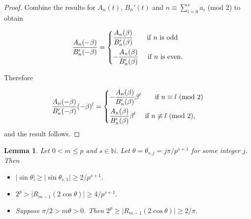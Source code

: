 \documentclass[11 pt]{amsart}
\theoremstyle{plain}
\newtheorem{lemma}[thm]{Lemma}
\theoremstyle{definition}
\theoremstyle{remark}
\def\N{\mathbb{N}}
\def\b{\beta}
\begin{document}
\begin{proof}
    Combine the results for $A_n(t)$, $B_n'(t)$ and $n \equiv \sum_{i=0}^s a_i$ (mod $2$) to obtain

    \begin{equation*}
        \frac{A_n(-\b)}{B_n'(-\b)}=\begin{dcases}
            \frac{A_n(\b)}{B_n'(\b)}  \qquad  \text{if $n$ is odd}\\
            -\frac{A_n(\b)}{B_n'(\b)} \quad \ \text{if $n$ is even}.
        \end{dcases}                  
    \end{equation*}

    Therefore

    \begin{equation*}
        \frac{A_n(-\b)}{B_n'(-\b)}(-\b)^l=\begin{dcases}
            -\frac{A_n(\b)}{B_n'(\b)}\b^l  \qquad  \text{if $n\equiv l$ (mod $2$)}\\
            \frac{A_n(\b)}{B_n'(\b)}\b^l \quad \ \text{if $n\not \equiv l$ (mod $2$)},
        \end{dcases}                  
    \end{equation*}
    and the result follows.
\end{proof}




\begin{lemma} \label{est_R_m-1} Let $0<m\le p$ and $s\in \N$. Let $\theta=\theta_{s, j}=j\pi/p^{s+1}$ for some integer $j$. Then
    \begin{itemize}
        \item [(1)] $\vert \sin \theta \vert \ge \vert \sin \theta_{s,1}\vert \ge 2/p^{s+1}.$
        \item[(2)] $2^p>\vert R_{m-1}(2 \cos \theta) \vert \ge 4/p^{s+1}.$
        \item[(3)] Suppose $\pi/2 > m\theta >0$. Then $2^p\ge\vert R_{m-1}(2 \cos \theta) \vert \ge 2/\pi.$
    \end{itemize}
\end{lemma}
\end{document}
